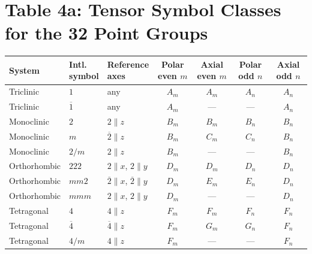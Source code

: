 \documentclass[a4paper,11pt]{article}
\newcommand{\ob}[1]{\overline{#1}}
\begin{document}
\section*{Table 4a: Tensor Symbol Classes for the 32 Point Groups}
\label{sec:table4a}
\vspace{-2mm}
{\setlength{\tabcolsep}{10pt}
\renewcommand{\arraystretch}{1.25}
\begin{tabular}{@{}l l l c c c c@{}}
\toprule
System & \shortstack{Intl.\\symbol} & \shortstack{Reference\\axes} &
  \shortstack{Polar\\even $m$} & \shortstack{Axial\\even $m$} &
  \shortstack{Polar\\odd $n$} & \shortstack{Axial\\odd $n$} \\
\midrule
Triclinic & $1$            & any                                     & $A_m$ & $A_m$ & $A_n$ & $A_n$ \\
Triclinic & $\ob{1}$       & any                                     & $A_m$ & ---   & ---   & $A_n$ \\
\addlinespace
Monoclinic & $2$           & $2 \!\parallel\! z$                     & $B_m$ & $B_m$ & $B_n$ & $B_n$ \\
Monoclinic & $m$           & $\ob{2} \!\parallel\! z$                & $B_m$ & $C_m$ & $C_n$ & $B_n$ \\
Monoclinic & $2/m$         & $2 \!\parallel\! z$                     & $B_m$ & ---   & ---   & $B_n$ \\
\addlinespace
Orthorhombic & $222$       & $2 \!\parallel\! x$, $2 \!\parallel\! y$ & $D_m$ & $D_m$ & $D_n$ & $D_n$ \\
Orthorhombic & $mm2$       & $\ob{2} \!\parallel\! x$, $\ob{2} \!\parallel\! y$ & $D_m$ & $E_m$ & $E_n$ & $D_n$ \\
Orthorhombic & $mmm$       & $2 \!\parallel\! x$, $2 \!\parallel\! y$ & $D_m$ & ---   & ---   & $D_n$ \\
\addlinespace
Tetragonal & $4$           & $4 \!\parallel\! z$                     & $F_m$ & $F_m$ & $F_n$ & $F_n$ \\
Tetragonal & $\ob{4}$      & $\ob{4} \!\parallel\! z$                & $F_m$ & $G_m$ & $G_n$ & $F_n$ \\
Tetragonal & $4/m$         & $4 \!\parallel\! z$                     & $F_m$ & ---   & ---   & $F_n$ \\

\end{tabular}}
\end{document}
